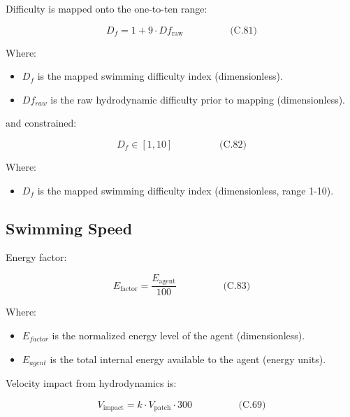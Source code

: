 \documentclass[
]{book}
\providecommand{\tightlist}{%
  \setlength{\itemsep}{0pt}\setlength{\parskip}{0pt}}
\begin{document}
Difficulty is mapped onto the one-to-ten range:

\[
\begin{equation} D_f = 1 + 9 \cdot Df_{\text{raw}}  \hspace{2cm} \text{(C.81)} \end{equation}
\]

Where:

\begin{itemize}
\tightlist
\item
  \(D_f\) is the mapped swimming difficulty index (dimensionless).
\item
  \(Df_{raw}\) is the raw hydrodynamic difficulty prior to mapping
  (dimensionless).
\end{itemize}

and constrained:

\[
\begin{equation} D_f \in [1, 10]  \hspace{2cm} \text{(C.82)} \end{equation}
\]

Where:

\begin{itemize}
\tightlist
\item
  \(D_f\) is the mapped swimming difficulty index (dimensionless, range
  1-10).
\end{itemize}

\subsection{Swimming Speed}\label{swimming-speed-1}

Energy factor:

\[
\begin{equation} E_{\text{factor}} = \frac{E_{\text{agent}}}{100}  \hspace{2cm} \text{(C.83)} \end{equation}
\]

Where:

\begin{itemize}
\item
  \(E_{factor}\) is the normalized energy level of the agent
  (dimensionless).
\item
  \(E_{agent}\) is the total internal energy available to the agent
  (energy units).
\end{itemize}

Velocity impact from hydrodynamics is:

\[ \begin{equation} V_{\text{impact}} = k \cdot V_{\text{patch}} \cdot 300  \hspace{2cm} \text{(C.69)} \end{equation} \]
\end{document}
